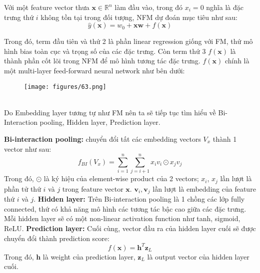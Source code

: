 \indent Với một feature vector thưa $\mathbf{x} \in \mathbb{R}^{n}$ làm đầu vào, trong đó $x_i = 0$ nghĩa là đặc trưng thứ $i$ không tồn tại trong đối tượng, 
NFM dự đoán mục tiêu như sau:
$$ \hat{y}(\mathbf{x}) = w_0 + \mathbf{xw} + f(\mathbf{x})$$

Trong đó, term đầu tiên và thứ 2 là phần linear regression giống với FM, 
thứ mô hình bias toàn cục và trọng số của các đặc trưng. Còn term thứ 3 $f(\mathbf{x})$ là thành phần cốt lõi trong NFM 
để mô hình tương tác đặc trưng. $f(\mathbf{x})$ chính là một multi-layer feed-forward neural network như bên dưới:
\begin{figure}[h]
    \centering
    \texttt{[image: figures/63.png]}
\end{figure}\\
Do Embedding layer tương tự như FM nên ta sẽ tiếp tục tìm hiểu về Bi-Interaction pooling, Hidden layer, Prediction layer.

\textbf{Bi-interaction pooling:} chuyển đổi tất các embedding vectors $V_x$ thành 1 vector như sau:
$$ f_{BI}(V_x) = \sum_{i=1}^{n} \sum_{j=i+1}^{n} x_i v_i \odot x_j v_j $$
Trong đó, $\odot$ là ký hiệu của element-wise product của 2 vectors; $x_i$, $x_j$ lần lượt 
là phần tử thứ $i$ và $j$ trong feature vector $\mathbf{x}$. $\mathbf{v}_i, \mathbf{v}_j$ lần lượt là embedding của feature thứ $i$ và $j$.
\textbf{Hidden layer:} Trên Bi-interaction pooling là 1 chồng các lớp fully connected, thứ có khả năng mô hình các tương tác bậc cao giữa các đặc trưng. 
Mỗi hidden layer sẽ có một non-linear activation function như tanh, sigmoid, ReLU.
\textbf{Prediction layer:} Cuối cùng, vector đầu ra của hidden layer cuối sẽ được chuyển đổi thành prediction score:
$$f(\mathbf{x}) = \mathbf{h}^T \mathbf{z}_L$$
Trong đó, $\mathbf{h}$ là weight của prediction layer, $\mathbf{z}_L$ là output vector của hidden layer cuối.
